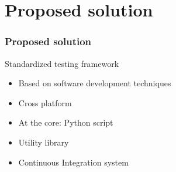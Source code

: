 \documentclass[british,10pt]{beamer}
\begin{document}
\section{Proposed solution}

\begin{frame}\frametitle{Proposed solution}
Standardized testing framework
\begin{itemize}
\item Based on software development techniques
\item Cross platform
\item At the core: Python script
\item Utility library
\item Continuous Integration system
\end{itemize}
\end{frame}




\end{document}
